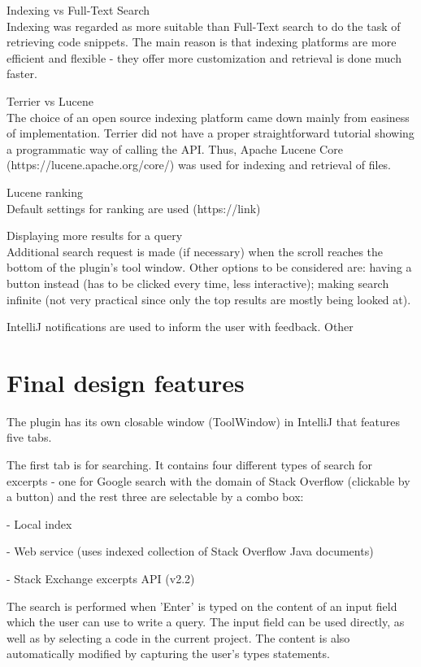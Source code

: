 \documentclass{l4proj}
\begin{document}
Indexing vs Full-Text Search\\
Indexing was regarded as more suitable than Full-Text search to do the task of retrieving code snippets. The main reason is that indexing platforms are more efficient and flexible - they offer more customization and retrieval is done much faster.

Terrier vs Lucene\\
The choice of an open source indexing platform came down mainly from easiness of implementation. Terrier did not have a proper straightforward tutorial showing a programmatic way of calling the API. Thus, Apache Lucene Core (https://lucene.apache.org/core/) was used for indexing and retrieval of files.

Lucene ranking\\
Default settings for ranking are used (https://link)

Displaying more results for a query\\
Additional search request is made (if necessary) when the scroll reaches the bottom of the plugin's tool window. Other options to be considered are: having a button instead (has to be clicked every time, less interactive); making search infinite (not very practical since only the top results are mostly being looked at).

IntelliJ notifications are used to inform the user with feedback. Other

\section{Final design features}
The plugin has its own closable window (ToolWindow) in IntelliJ that features five tabs.

The first tab is for searching. It contains four different types of search for excerpts - one for Google search with the domain of Stack Overflow (clickable by a button) and the rest three are selectable by a combo box:

- Local index

- Web service (uses indexed collection of Stack Overflow Java documents)

- Stack Exchange excerpts API (v2.2)

The search is performed when 'Enter' is typed on the content of an input field which the user can use to write a query. The input field can be used directly, as well as by selecting a code in the current project. The content is also automatically modified by capturing the user's types statements.
\end{document}
